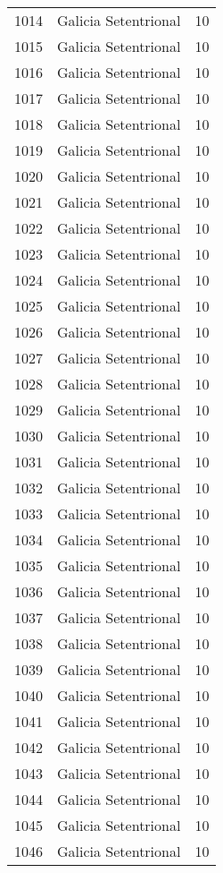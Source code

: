 \begin{table}[p]
\begin{tabular}{rlr}
  1014 & Galicia Setentrional &  10 \\ 
  1015 & Galicia Setentrional &  10 \\ 
  1016 & Galicia Setentrional &  10 \\ 
  1017 & Galicia Setentrional &  10 \\ 
  1018 & Galicia Setentrional &  10 \\ 
  1019 & Galicia Setentrional &  10 \\ 
  1020 & Galicia Setentrional &  10 \\ 
  1021 & Galicia Setentrional &  10 \\ 
  1022 & Galicia Setentrional &  10 \\ 
  1023 & Galicia Setentrional &  10 \\ 
  1024 & Galicia Setentrional &  10 \\ 
  1025 & Galicia Setentrional &  10 \\ 
  1026 & Galicia Setentrional &  10 \\ 
  1027 & Galicia Setentrional &  10 \\ 
  1028 & Galicia Setentrional &  10 \\ 
  1029 & Galicia Setentrional &  10 \\ 
  1030 & Galicia Setentrional &  10 \\ 
  1031 & Galicia Setentrional &  10 \\ 
  1032 & Galicia Setentrional &  10 \\ 
  1033 & Galicia Setentrional &  10 \\ 
  1034 & Galicia Setentrional &  10 \\ 
  1035 & Galicia Setentrional &  10 \\ 
  1036 & Galicia Setentrional &  10 \\ 
  1037 & Galicia Setentrional &  10 \\ 
  1038 & Galicia Setentrional &  10 \\ 
  1039 & Galicia Setentrional &  10 \\ 
  1040 & Galicia Setentrional &  10 \\ 
  1041 & Galicia Setentrional &  10 \\ 
  1042 & Galicia Setentrional &  10 \\ 
  1043 & Galicia Setentrional &  10 \\ 
  1044 & Galicia Setentrional &  10 \\ 
  1045 & Galicia Setentrional &  10 \\ 
  1046 & Galicia Setentrional &  10 \\ 

\end{tabular}
\end{table}
